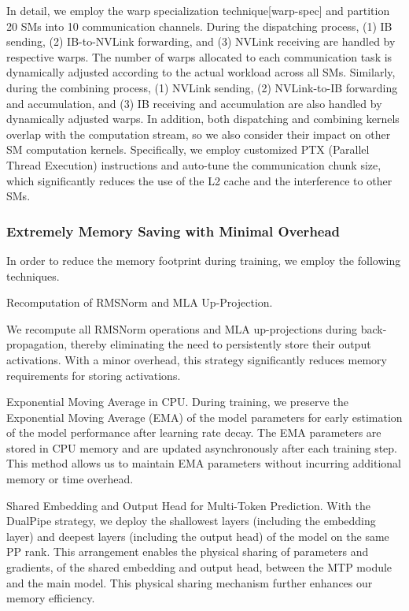 \documentclass[11pt,a4paper]{article}
\begin{document}
In detail, we employ the warp specialization technique[warp-spec] and partition 20 SMs into 10 communication channels. During the dispatching process, (1) IB sending, (2) IB-to-NVLink forwarding, and (3) NVLink receiving are handled by respective warps. The number of warps allocated to each communication task is dynamically adjusted according to the actual workload across all SMs. Similarly, during the combining process, (1) NVLink sending, (2) NVLink-to-IB forwarding and accumulation, and (3) IB receiving and accumulation are also handled by dynamically adjusted warps. In addition, both dispatching and combining kernels overlap with the computation stream, so we also consider their impact on other SM computation kernels. Specifically, we employ customized PTX (Parallel Thread Execution) instructions and auto-tune the communication chunk size, which significantly reduces the use of the L2 cache and the interference to other SMs.

\subsubsection{Extremely Memory Saving with Minimal Overhead}

In order to reduce the memory footprint during training, we employ the following techniques.

Recomputation of RMSNorm and MLA Up-Projection.

We recompute all RMSNorm operations and MLA up-projections during back-propagation, thereby eliminating the need to persistently store their output activations. With a minor overhead, this strategy significantly reduces memory requirements for storing activations.

Exponential Moving Average in CPU. During training, we preserve the Exponential Moving Average (EMA) of the model parameters for early estimation of the model performance after learning rate decay. The EMA parameters are stored in CPU memory and are updated asynchronously after each training step. This method allows us to maintain EMA parameters without incurring additional memory or time overhead.

Shared Embedding and Output Head for Multi-Token Prediction. With the DualPipe strategy, we deploy the shallowest layers (including the embedding layer) and deepest layers (including the output head) of the model on the same PP rank. This arrangement enables the physical sharing of parameters and gradients, of the shared embedding and output head, between the MTP module and the main model. This physical sharing mechanism further enhances our memory efficiency.
\end{document}
